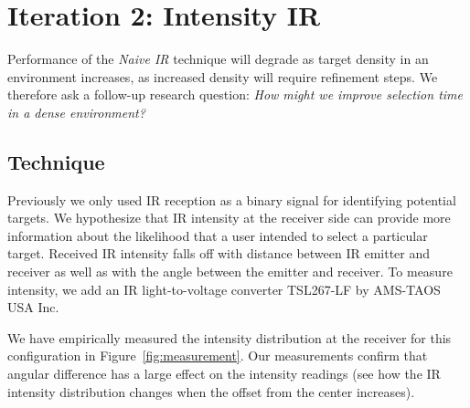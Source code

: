 
\section{Iteration 2: Intensity IR}


Performance of the {\em Naive IR} technique will degrade as target density in an environment increases, as increased density will require refinement steps. We therefore ask a follow-up research question: {\em How might we improve selection time in a dense environment?}

\subsection{Technique}
Previously we only used IR reception as a binary signal for identifying potential targets. We hypothesize that IR intensity at the receiver side can provide more information about the likelihood that a user intended to select a particular target. Received IR intensity falls off with distance between IR emitter and receiver as well as with the angle between the emitter and receiver. To measure intensity, we add an IR light-to-voltage converter TSL267-LF by AMS-TAOS USA Inc.


We have empirically measured the intensity distribution at the receiver for this configuration in Figure~\ref{fig:measurement}. Our measurements confirm that angular difference has a large effect on the intensity readings (see how the IR intensity distribution changes when the offset from the center increases).

